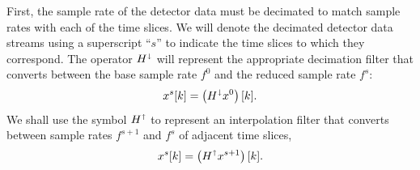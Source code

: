 \documentclass[preprint2]{aastex}
\begin{document}
First, the sample rate of the detector data must be decimated to match sample
rates with each of the time slices.  We will denote the decimated detector data
streams using a superscript ``$s$'' to indicate the time slices to which they
correspond.  The operator $H^\shortdownarrow$ will represent the appropriate
decimation filter that converts between the base sample rate $f^0$ and the
reduced sample rate $f^s$:
\begin{equation*}
\label{eq:decomp}
	x^{s}[k] = \left( H^\shortdownarrow x^0\right)[k].
\end{equation*}
We shall use the symbol $H^\shortuparrow$ to represent an interpolation filter
that converts between sample rates $f^{s+1}$ and $f^s$ of adjacent time slices,
\begin{equation*}
	x^{s}[k] = \left( H^\shortuparrow x^{s+1}\right)[k].
\end{equation*}
\end{document}
